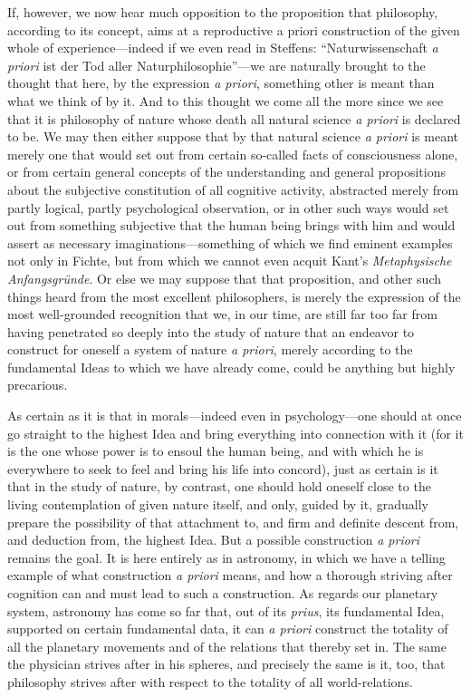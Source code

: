 \documentclass[12pt,a4paper]{book}
\begin{document}
{\small If, however, we now hear much opposition to the proposition that philosophy,
according to its concept, aims at a reproductive a priori construction of the given
whole of experience---indeed if we even read in Steffens: ``Naturwissenschaft
\textit{a priori} ist der Tod aller Naturphilosophie''---we are naturally brought to
the thought that here, by the expression \textit{a priori}, something other is meant
than what we think of by it. And to this thought we come all the more since we see
that it is philosophy of nature whose death all natural science \textit{a priori} is
declared to be. We may then either suppose that by that natural science \textit{a
priori} is meant merely one that would set out from certain so-called facts of
consciousness alone, or from certain general concepts of the understanding and
general propositions about the subjective constitution of all cognitive activity,
abstracted merely from partly logical, partly psychological observation, or in other
such ways would set out from something subjective that the human being brings with
him and would assert as necessary imaginations---something of which we find eminent
examples not only in Fichte, but from which we cannot even acquit Kant's
\textit{Metaphysische Anfangsgründe}. Or else we may suppose that that proposition,
and other such things heard from the most excellent philosophers, is merely the
expression of the most well-grounded recognition that we, in our time, are still far
too far from having penetrated so deeply into the study of nature that an endeavor to
construct for oneself a system of nature \textit{a priori}, merely according to the
fundamental Ideas to which we have already come, could be anything but highly
precarious.\par}

{\small As certain as it is that in morals---indeed even in psychology---one should at
once go straight to the highest Idea and bring everything into connection with it (for
it is the one whose power is to ensoul the human being, and with which he is
everywhere to seek to feel and bring his life into concord), just as certain is it
that in the study of nature, by contrast, one should hold oneself close to the living
contemplation of given nature itself, and only, guided by it, gradually prepare the
possibility of that attachment to, and firm and definite descent from, and deduction
from, the highest Idea. But a possible construction \textit{a priori} remains the
goal. It is here entirely as in astronomy, in which we have a telling example of what
construction \textit{a priori} means, and how a thorough striving after cognition can
and must lead to such a construction. As regards our planetary system, astronomy has
come so far that, out of its \textit{prius}, its fundamental Idea, supported on certain
fundamental data, it can \textit{a priori} construct the totality of all the planetary
movements and of the relations that thereby set in. The same the physician strives
after in his spheres, and precisely the same is it, too, that philosophy strives after
with respect to the totality of all world-relations.\par}
\end{document}
